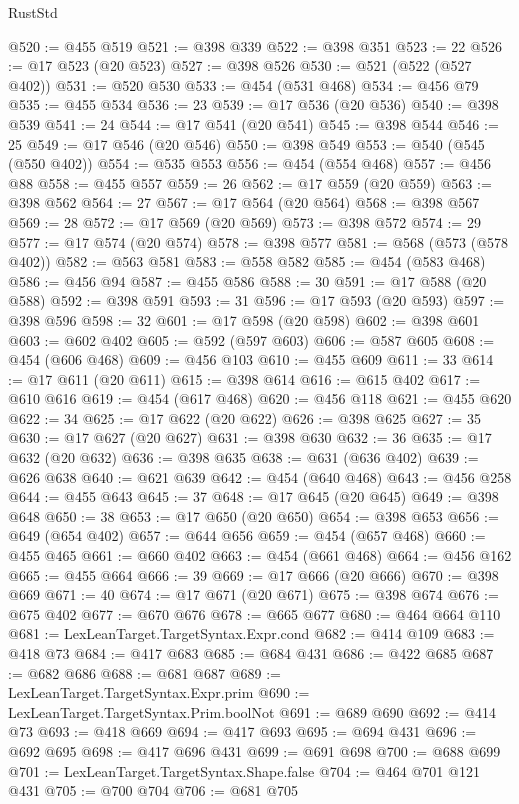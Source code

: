 \begin{lexlean}{RustStd}
\begin{coremodule}
{\begin{coremodule}
{{{{{{{{{{{{{{{{{{{{{{{{{{{{{{{{@520 := @455 @519
@521 := @398 @339
@522 := @398 @351
@523 := 22
@526 := @17 @523 (@20 @523)
@527 := @398 @526
@530 := @521 (@522 (@527 @402))
@531 := @520 @530
@533 := @454 (@531 @468)
@534 := @456 @79
@535 := @455 @534
@536 := 23
@539 := @17 @536 (@20 @536)
@540 := @398 @539
@541 := 24
@544 := @17 @541 (@20 @541)
@545 := @398 @544
@546 := 25
@549 := @17 @546 (@20 @546)
@550 := @398 @549
@553 := @540 (@545 (@550 @402))
@554 := @535 @553
@556 := @454 (@554 @468)
@557 := @456 @88
@558 := @455 @557
@559 := 26
@562 := @17 @559 (@20 @559)
@563 := @398 @562
@564 := 27
@567 := @17 @564 (@20 @564)
@568 := @398 @567
@569 := 28
@572 := @17 @569 (@20 @569)
@573 := @398 @572
@574 := 29
@577 := @17 @574 (@20 @574)
@578 := @398 @577
@581 := @568 (@573 (@578 @402))
@582 := @563 @581
@583 := @558 @582
@585 := @454 (@583 @468)
@586 := @456 @94
@587 := @455 @586
@588 := 30
@591 := @17 @588 (@20 @588)
@592 := @398 @591
@593 := 31
@596 := @17 @593 (@20 @593)
@597 := @398 @596
@598 := 32
@601 := @17 @598 (@20 @598)
@602 := @398 @601
@603 := @602 @402
@605 := @592 (@597 @603)
@606 := @587 @605
@608 := @454 (@606 @468)
@609 := @456 @103
@610 := @455 @609
@611 := 33
@614 := @17 @611 (@20 @611)
@615 := @398 @614
@616 := @615 @402
@617 := @610 @616
@619 := @454 (@617 @468)
@620 := @456 @118
@621 := @455 @620
@622 := 34
@625 := @17 @622 (@20 @622)
@626 := @398 @625
@627 := 35
@630 := @17 @627 (@20 @627)
@631 := @398 @630
@632 := 36
@635 := @17 @632 (@20 @632)
@636 := @398 @635
@638 := @631 (@636 @402)
@639 := @626 @638
@640 := @621 @639
@642 := @454 (@640 @468)
@643 := @456 @258
@644 := @455 @643
@645 := 37
@648 := @17 @645 (@20 @645)
@649 := @398 @648
@650 := 38
@653 := @17 @650 (@20 @650)
@654 := @398 @653
@656 := @649 (@654 @402)
@657 := @644 @656
@659 := @454 (@657 @468)
@660 := @455 @465
@661 := @660 @402
@663 := @454 (@661 @468)
@664 := @456 @162
@665 := @455 @664
@666 := 39
@669 := @17 @666 (@20 @666)
@670 := @398 @669
@671 := 40
@674 := @17 @671 (@20 @671)
@675 := @398 @674
@676 := @675 @402
@677 := @670 @676
@678 := @665 @677
@680 := @464 @664 @110
@681 := LexLeanTarget.TargetSyntax.Expr.cond
@682 := @414 @109
@683 := @418 @73
@684 := @417 @683
@685 := @684 @431
@686 := @422 @685
@687 := @682 @686
@688 := @681 @687
@689 := LexLeanTarget.TargetSyntax.Expr.prim
@690 := LexLeanTarget.TargetSyntax.Prim.boolNot
@691 := @689 @690
@692 := @414 @73
@693 := @418 @669
@694 := @417 @693
@695 := @694 @431
@696 := @692 @695
@698 := @417 @696 @431
@699 := @691 @698
@700 := @688 @699
@701 := LexLeanTarget.TargetSyntax.Shape.false
@704 := @464 @701 @121 @431
@705 := @700 @704
@706 := @681 @705
}}}}}}}}}}}}}}}}}}}}}}}}}}}}}}}}
\end{coremodule}}
\end{coremodule}
\end{lexlean}
